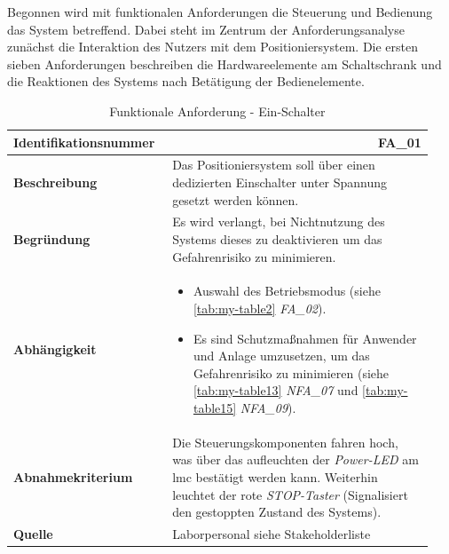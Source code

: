 \documentclass[../../../Bachelorarbeit.tex]{subfiles}
\begin{document}
Begonnen wird mit funktionalen Anforderungen die Steuerung und Bedienung das System betreffend. Dabei steht im Zentrum der Anforderungsanalyse zunächst die Interaktion des Nutzers mit dem Positioniersystem. Die ersten sieben Anforderungen beschreiben die Hardwareelemente am Schaltschrank und die Reaktionen des Systems nach Betätigung der Bedienelemente.
\begin{table}[H]
    \centering
    \begin{tabular}{ p{0.34\linewidth}  p{0.6\linewidth} }
        \hline
        \textbf{Identifikationsnummer}  & \multicolumn{1}{r}{FA\_01} \\ \hline
        \textbf{Beschreibung}           & Das Positioniersystem soll über einen dedizierten Einschalter unter Spannung gesetzt werden können. \\
        \textbf{Begründung}             & Es wird verlangt, bei Nichtnutzung des Systems dieses zu deaktivieren um das Gefahrenrisiko zu minimieren. \\
        \textbf{Abhängigkeit}           &   {\begin{itemize}[noitemsep,topsep=0pt,parsep=0pt,partopsep=0pt,leftmargin=*]
                                                \item Auswahl des Betriebsmodus (siehe \autoref{tab:my-table2} \textit{FA\_02}).
                                                \item Es sind Schutzmaßnahmen für Anwender und Anlage umzusetzen, um das Gefahrenrisiko zu minimieren (siehe \autoref{tab:my-table13} \textit{NFA\_07} und \autoref{tab:my-table15} \textit{NFA\_09}).
                                            \end{itemize}} \\
        \textbf{Abnahmekriterium}       & Die Steuerungskomponenten fahren hoch, was über das aufleuchten der \textit{Power-LED} am \acs{lmc} bestätigt werden kann. Weiterhin leuchtet der rote \textit{STOP-Taster} (Signalisiert den gestoppten Zustand des Systems). \\
        \textbf{Quelle}                 & Laborpersonal siehe Stakeholderliste \\ \hline
    \end{tabular}
    \caption[\acs{fa} - EIN-Schalter]{Funktionale Anforderung - Ein-Schalter}
    \label{tab:my-table}
\end{table}
\end{document}
